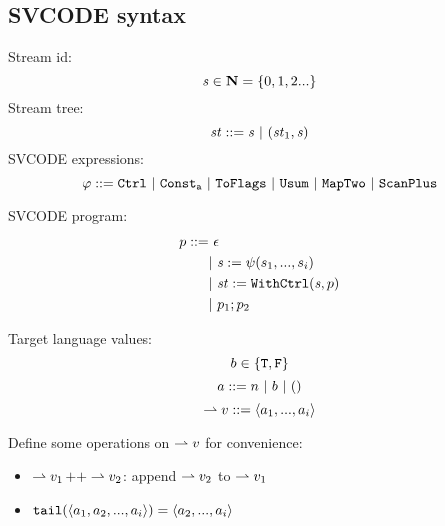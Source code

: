 \subsection{SVCODE syntax}
Stream id: $$\mathit{s} \in \mathbf{N} = \{0,1,2...\}$$
Stream tree: $$ \mathit{st} ::= \mathit{s} \ | \ (\mathit{st}_1,\mathit{s}) $$
SVCODE expressions: $$\varphi ::= \mathtt{Ctrl} \ | \ \mathtt{Const_{a}} \ | \ \mathtt{ToFlags}
\ | \ \mathtt{Usum} \ | \ \mathtt{MapTwo} \ | \ \mathtt{ScanPlus} $$

SVCODE program: 
\begin{align*}
	p ::= & \ \epsilon \\
	     &| \ \mathit{s} := \psi(s_1,...,s_i) \\
	     &| \ \mathit{st} := \mathtt{WithCtrl}(\mathit{s},p) \\
	     &| \ p_1;p_2 	 
\end{align*}

Target language values: 
$$b \in \{\mathtt{T},\mathtt{F} \}$$
$$a ::= n \ | \ b \ | \ \unit $$
$$\rightharpoonup v ::= \langle a_1,...,a_i \rangle $$

Define some operations on $\rightharpoonup v$ for convenience:
\begin{itemize}
	\item $\rightharpoonup v_1 \operatorname{++} \rightharpoonup v_2 $: append $\rightharpoonup v_2$ to $\rightharpoonup v_1$
	\item $\mathtt{tail}(\langle a_1, a_2,...,a_i \rangle) = \langle a_2,...,a_i \rangle$
\end{itemize}


